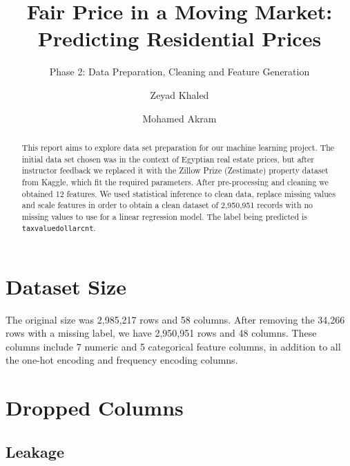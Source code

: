 \documentclass[sigconf,nonacm,10pt]{acmart}
\begin{document}
\title{Fair Price in a Moving Market: Predicting Residential Prices}
\subtitle{Phase 2: Data Preparation, Cleaning and Feature Generation}

\author{Zeyad Khaled}

\author{Mohamed Akram}

\begin{abstract}
This report aims to explore data set preparation for our machine learning project. The initial data set chosen was in the context of Egyptian real estate prices, but after instructor feedback we replaced it with the Zillow Prize (Zestimate) property dataset from Kaggle, which fit the required parameters. After pre-processing and cleaning we obtained 12 features. We used statistical inference to clean data, replace missing values and scale features in order to obtain a clean dataset of 2,950,951 records with no missing values to use for a linear regression model. The label being predicted is \texttt{taxvaluedollarcnt}.
\end{abstract}


\maketitle

\section{Dataset Size}

The original size was 2,985,217 rows and 58 columns. After removing the 34,266 rows with a missing label, we have 2,950,951 rows and 48 columns. These columns include 7 numeric and 5 categorical feature columns, in addition to all the one-hot encoding and frequency encoding columns.

\section{Dropped Columns}

\subsection{Leakage}
\end{document}
